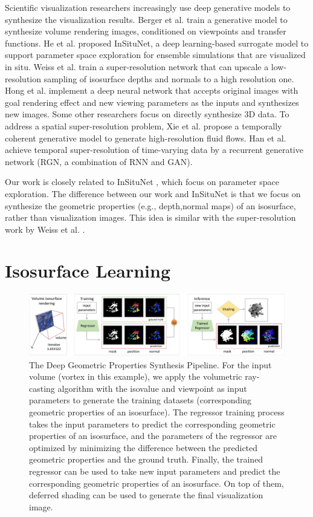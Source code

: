 \documentclass[journal]{vgtc}                %
\begin{document}
Scientific visualization researchers increasingly use deep generative models to synthesize the visualization results. Berger et al. \cite{berger2018generative} train a generative model to synthesize volume rendering images, conditioned on viewpoints and transfer functions. He et al. \cite{he2019insitunet} proposed InSituNet, a deep learning-based surrogate model to support parameter space exploration for ensemble simulations that are visualized in situ. Weiss et al. \cite{weiss2019volumetric} train a super-resolution network that can upscale a low-resolution sampling of isosurface depths and normals to a high resolution one. Hong et al. \cite{hong2019dnn} implement a deep neural network that accepts original images with goal rendering effect and new viewing parameters as the inputs and synthesizes new images. Some other researchers focus on directly synthesize 3D data. To address a spatial super-resolution problem, Xie et al. \cite{xie2018tempogan} propose a temporally coherent generative model to generate high-resolution fluid flows. Han et al. \cite{han2019tsr} achieve temporal super-resolution of time-varying data by a recurrent generative network (RGN, a combination of RNN and GAN).

Our work is closely related to InSituNet \cite{he2019insitunet}, which focus on parameter space exploration. The difference between our work and InSituNet is that we focus on synthesize the  geometric properties (e.g., depth,normal maps) of an isosurface, rather than visualization images. This idea is similar with the super-resolution work by Weiss et al. \cite{weiss2019volumetric}. 

\section{Isosurface Learning}

\begin{figure}
  \centering
  \includegraphics[width=\linewidth]{overview}
  \caption{The Deep Geometric Properties Synthesis Pipeline. For the input volume (vortex in this example), we apply the volumetric ray-casting algorithm with the isovalue and viewpoint as input parameters to generate the training datasets (corresponding geometric properties of an isosurface). The regressor training process takes the input parameters to predict the corresponding geometric properties of an isosurface, and the parameters of the regressor are optimized by minimizing the difference between the predicted geometric properties and the ground truth. Finally, the trained regressor can be used to take new input parameters and predict the corresponding geometric properties of an isosurface. On top of them, deferred shading can be used to generate the final visualization image. }
	\label{fig:overview}
\end{figure}
\end{document}
